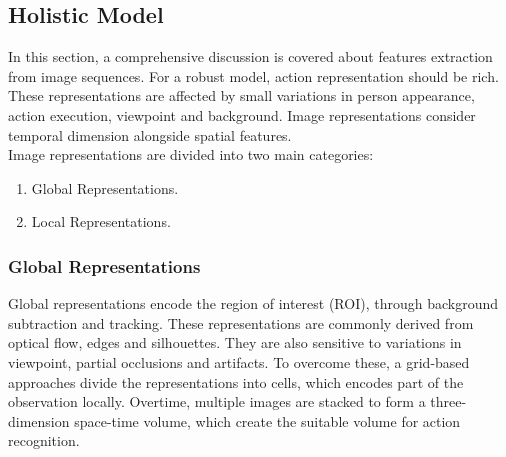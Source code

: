 \subsection{Holistic Model}
\hspace{5mm} In this section, a comprehensive discussion is covered about features extraction from image sequences. For a robust model, action representation should be rich. These representations are affected by small variations in person appearance, action execution, viewpoint and background. Image representations consider temporal dimension alongside spatial features.\\
\hspace{5mm} Image representations are divided into two main categories:\\
\begin{enumerate}
\item Global Representations.
\item Local Representations.
\end{enumerate}

\subsubsection{Global Representations}
\hspace{5mm} Global representations encode the region of interest (ROI), through background subtraction and tracking. These representations are commonly derived from optical flow, edges and silhouettes. They are also sensitive to variations in viewpoint, partial occlusions and artifacts. To overcome these, a grid-based approaches divide the representations into cells, which encodes part of the observation locally. Overtime, multiple images are stacked to form a three-dimension space-time volume, which create the suitable volume for action recognition.\\ 

